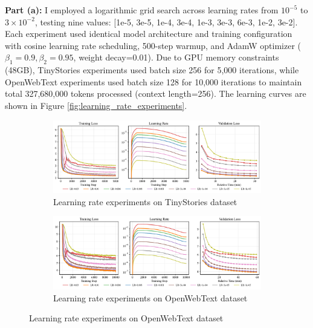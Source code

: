\begin{answer}

\textbf{Part (a):}
I employed a logarithmic grid search across learning rates from $10^{-5}$ to $3 \times 10^{-2}$, testing nine values: [1e-5, 3e-5, 1e-4, 3e-4, 1e-3, 3e-3, 6e-3, 1e-2, 3e-2]. Each experiment used identical model architecture and training configuration with cosine learning rate scheduling, 500-step warmup, and AdamW optimizer ($\beta_1=0.9, \beta_2=0.95$, weight decay=0.01). Due to GPU memory constraints (48GB), TinyStories experiments used batch size 256 for 5,000 iterations, while OpenWebText experiments used batch size 128 for 10,000 iterations to maintain total 327,680,000 tokens processed (context length=256). The learning curves are shown in Figure \ref{fig:learning_rate_experiments}.

\begin{figure}[!htb]
    \centering
    \begin{subfigure}[t]{\textwidth}
        \centering
        \includegraphics[width=\textwidth]{images/ts_learning_rate_experiments.pdf}
        \vspace{-20pt} %
        \caption{Learning rate experiments on TinyStories dataset}
        \label{fig:ts_learning_rate_experiments}
    \end{subfigure}
        
    \begin{subfigure}[t]{\textwidth}
        \centering
        \includegraphics[width=\textwidth]{images/owt_learning_rate_experiments.pdf}
        \vspace{-20pt} %
        \caption{Learning rate experiments on OpenWebText dataset}
        \label{fig:owt_learning_rate_experiments}
    \end{subfigure}
    

\end{figure}
\end{answer}
